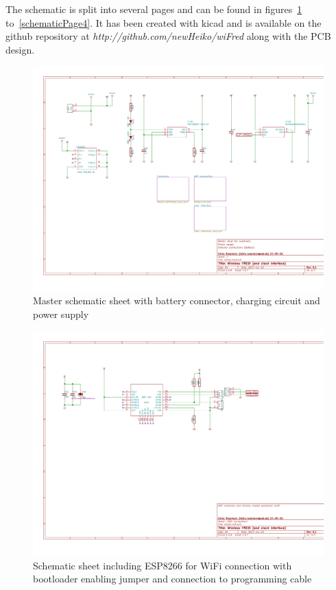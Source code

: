 \documentclass[11pt,a4paper]{scrartcl}
\begin{document}
The schematic is split into several pages and can be found in figures~\ref{schematicPage1} to~\ref{schematicPage4}. It has been created with kicad and is available on the github repository at \textit{http://github.com/newHeiko/wiFred} along with the PCB design.

\begin{figure}[tbh]
  \centering
  \includegraphics[width=\textwidth]{images/wfred_rev2}
  \caption{Master schematic sheet with battery connector, charging circuit and power supply}
  \label{schematicPage1}
\end{figure}

\begin{figure}[tbh]
  \centering
  \includegraphics[width=\textwidth]{images/wfred-wifi-Wifi_connection}
  \caption{Schematic sheet including ESP8266 for WiFi connection with bootloader enabling jumper and connection to programming cable}
  \label{schematicPage2}
\end{figure}
\end{document}
